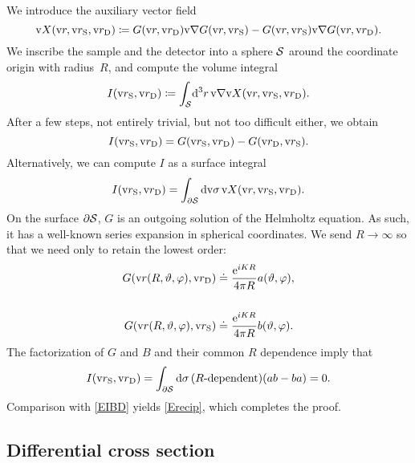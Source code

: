 We introduce the auxiliary vector field
\begin{equation}
  \text{v}{X}(\text{v}{r},\text{v}{r}_\text{S},\text{v}{r}_\text{D})\coloneqq G(\text{v}{r},\text{v}{r}_\text{D})\text{v}{\nabla} G(\text{v}{r},\text{v}{r}_\text{S}) - G(\text{v}{r},\text{v}{r}_\text{S})\text{v}{\nabla} G(\text{v}{r},\text{v}{r}_\text{D}).
\end{equation}
We inscribe the sample and the detector
into a sphere $\mathcal{S}$ around the coordinate origin with radius~$R$,
and compute the volume integral
\begin{equation}\label{Eprerecipro}
    I(\text{v}{r}_\text{S},\text{v}{r}_\text{D}) \coloneqq \displaystyle\int_{\mathcal{S}}\!\mathrm d^3r\,\text{v}{\nabla} \text{v}{X}(\text{v}{r},\text{v}{r}_\text{S},\text{v}{r}_\text{D}).
\end{equation}
After a few steps, not entirely trivial, but not too difficult either,
we obtain
\begin{equation}\label{EIBD}
  I(\text{v}{r}_\text{S},\text{v}{r}_\text{D}) = G(\text{v}{r}_\text{S},\text{v}{r}_\text{D}) - G(\text{v}{r}_\text{D},\text{v}{r}_\text{S}).
\end{equation}
Alternatively, we can compute $I$ as a surface integral
\begin{equation}
  I(\text{v}{r}_\text{S},\text{v}{r}_\text{D})
  =\displaystyle\int_{\partial\mathcal{S}}\mathrm d\text{v}{\sigma}\,\text{v}{X}(\text{v}{r},\text{v}{r}_\text{S},\text{v}{r}_\text{D}).
\end{equation}
On the surface $\partial\mathcal{S}$,
$G$ is an outgoing solution of the Helmholtz equation.
As such, it has a well-known series expansion in spherical coordinates.
We send $R\to\infty$ so that we need only to retain the lowest order:
\begin{align}
   G(\text{v}{r}(R,\vartheta,\varphi),\text{v}{r}_\text{D})
   &\doteq\displaystyle \frac{\mathrm e^{iKR}}{4\pi R} a(\vartheta,\varphi),
   \\[3.8ex]
   G(\text{v}{r}(R,\vartheta,\varphi),\text{v}{r}_\text{S})
   &\doteq\displaystyle \frac{\mathrm e^{iKR}}{4\pi R} b(\vartheta,\varphi).
\end{align}
The factorization of $G$ and $B$ and their common $R$ dependence imply that
\begin{equation}
  I(\text{v}{r}_\text{S},\text{v}{r}_\text{D})
  =\displaystyle\int_{\partial\mathcal{S}}\mathrm d\sigma\,
       (\text{$R$-dependent})(ab-ba)
  = 0.
\end{equation}
Comparison with \cref{EIBD} yields \cref{Erecip},
which completes the proof.

%
%



\subsection{Differential cross section}\label{SdiffCross}

